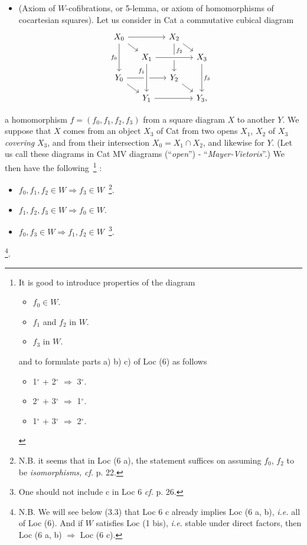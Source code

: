 \documentclass[11pt]{article}
\begin{document}
\begin{itemize}[leftmargin=5em,labelwidth=4em,align=left]
\item[\textbf{Loc 6}] (Axiom of $W$-cofibrations, or 5-lemma, or axiom of homomorphisms of cocartesian squares). Let us consider in Cat a commutative cubical diagram
\[
\begin{tikzcd}[row sep=small,column sep=small]
X_0 \arrow[rr] \arrow[dr] \arrow[dd,"f_0"'] & & X_2 \arrow[dr] \arrow[dd,"f_2" near start] & \\
& X_1 \arrow[rr,crossing over] & & X_3 \arrow[dd,"f_3"] \\
Y_0 \arrow[rr] \arrow[dr] & & Y_2 \arrow[dr] & \\
& Y_1 \arrow[rr] \arrow[from=uu,crossing over,"f_1"' near start] & & Y_3,
\end{tikzcd}
\]
\end{itemize}
a homomorphism $f=(f_0,f_1,f_2,f_3)$ from a square diagram $X$ to another $Y$. We suppose that $X$ comes from an object $X_3$ of Cat from two opens $X_1$, $X_2$ of $X_3$ \textit{covering} $X_3$, and from their intersection $X_0=X_1\cap X_2$, and likewise for $Y$. (Let us call these diagrams in Cat MV diagrams (``\textit{open}'') - ``\textit{Mayer-Vietoris}''.) We then have the following~\footnote[9]{It is good to introduce properties of the diagram
\begin{itemize}[leftmargin=3em,labelwidth=2.5em,align=right]
\item[1$^{\circ}$)] $f_0\in W$.
\item[2$^{\circ}$)] $f_1$ and $f_2$ in $W$.
\item[3$^{\circ}$)] $f_3$ in $W$.
\end{itemize}
and to formulate parts a) b) c) of Loc (6) as follows
\begin{itemize}[leftmargin=3em,labelwidth=2.5em,align=right]
\item[a)] 1$^{\circ}$ + 2$^{\circ}$ $\Longrightarrow$ 3$^{\circ}$.
\item[b)] 2$^{\circ}$ + 3$^{\circ}$ $\Longrightarrow$ 1$^{\circ}$.
\item[c)] 1$^{\circ}$ + 3$^{\circ}$ $\Longrightarrow$ 2$^{\circ}$.
\end{itemize}} :
\begin{itemize}[leftmargin=3em,labelwidth=2.5em,align=right]
\item[a)] $f_0,f_1,f_2\in W\Longrightarrow f_3\in W$~\footnote[10]{N.B. it seems that in Loc (6 a), the statement suffices on assuming $f_0$, $f_2$ to be \textit{isomorphisms,} \textit{cf.} p. 22.}.
\item[b)] $f_1,f_2,f_3\in W\Longrightarrow f_0\in W$.
\item[c)] $f_0,f_3\in W\Longrightarrow f_1,f_2\in W$~\footnote[11]{One should not include c in Loc 6 \textit{cf.} p. 26.}.
\end{itemize}
\noindent\footnote[12]{N.B. We will see below (3.3) that Loc 6 c already implies Loc (6 a, b), \textit{i.e.} all of Loc (6). And if $W$ satisfies Loc (1 bis), \textit{i.e.} stable under direct factors, then Loc (6 a, b) $\Longrightarrow$ Loc (6 c).}.
\end{document}
